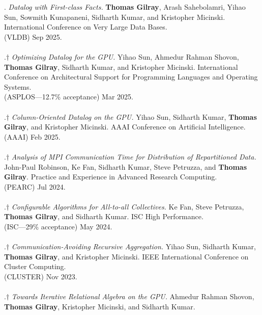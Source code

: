 \paper. \textit{Datalog with First-class Facts.}
\textbf{Thomas Gilray}, Arash Sahebolamri, Yihao Sun, Sowmith Kunapaneni, Sidharth Kumar, and Kristopher Micinski.
International Conference on Very Large Data Bases.
\\(VLDB) Sep 2025. 
\\ \vspace{-0.1cm}\\
\paper.$\dagger$ \textit{Optimizing Datalog for the GPU.}
Yihao Sun, Ahmedur Rahman Shovon, \textbf{Thomas Gilray}, Sidharth Kumar, and Kristopher Micinski.
International Conference on Architectural Support for Programming Languages and Operating Systems.
\\(ASPLOS---12.7\% acceptance) Mar 2025. 
\\ \vspace{-0.1cm}\\
\paper.$\dagger$ \textit{Column-Oriented Datalog on the GPU.}
Yihao Sun, Sidharth Kumar, \textbf{Thomas Gilray}, and Kristopher Micinski.
AAAI Conference on Artificial Intelligence.
\\(AAAI) Feb 2025. 
\\ \vspace{-0.1cm}\\
\paper.$\dagger$ \textit{Analysis of MPI Communication Time for Distribution of Repartitioned Data.}
John-Paul Robinson, Ke Fan, Sidharth Kumar, Steve Petruzza, and \textbf{Thomas Gilray}.
Practice and Experience in Advanced Research Computing.
\\(PEARC) Jul 2024. 
\\ \vspace{-0.1cm}\\
\paper.$\dagger$ \textit{Configurable Algorithms for All-to-all Collectives.}
Ke Fan, Steve Petruzza, \textbf{Thomas Gilray}, and Sidharth Kumar.
ISC High Performance.
\\(ISC---29\% acceptance) May 2024. 
\\ \vspace{-0.1cm}\\
\paper.$\dagger$ \textit{Communication-Avoiding Recursive Aggregation.}
Yihao Sun, Sidharth Kumar, \textbf{Thomas Gilray}, and Kristopher Micinski.
IEEE International Conference on Cluster Computing.
\\(CLUSTER) Nov 2023. 
\\ \vspace{-0.1cm}\\
\paper.$\dagger$ \textit{Towards Iterative Relational Algebra on the GPU.}
Ahmedur Rahman Shovon, \textbf{Thomas Gilray}, Kristopher Micinski, and Sidharth Kumar.
